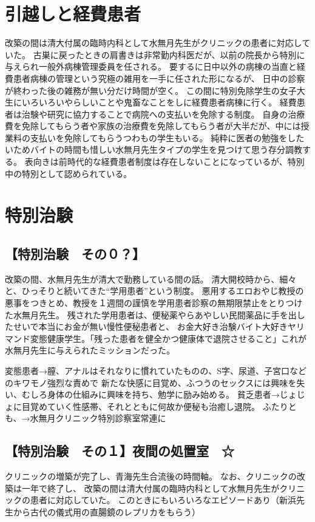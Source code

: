 \chapter{引越しと経費患者}
改築の間は清大付属の臨時内科として水無月先生がクリニックの患者に対応していた。
古巣に戻ったときの肩書きは非常勤内科医だが、以前の院長から特別に与えられ一般外病棟管理委員を任される。
要するに日中以外の病棟の当直と経費患者病棟の管理という究極の雑用を一手に任された形になるが、
日中の診察が終わった後の雑務が無い分だけ時間が空く。
この間に特別免除学生の女子大生にいろいろいやらしいことや鬼畜なことをしに経費患者病棟に行く。
経費患者は治験や研究に協力することで病院への支払いを免除する制度。
自身の治療費を免除してもらう者や家族の治療費を免除してもらう者が大半だが、中には授業料の支払いを免除してもらうつわもの学生もいる。
純粋に医者の勉強をしたいためバイトの時間も惜しい水無月先生タイプの学生を見つけて思う存分調教する。
表向きは前時代的な経費患者制度は存在しないことになっているが、特別中の特別として認められている。


\chapter{特別治験}
\section{【特別治験　その０？】}
改築の間、水無月先生が清大で勤務している間の話。
清大開校時から、細々と、ひっそりと続いてきた“学用患者”という制度。
悪用するエロおやじ教授の悪事をつきとめ、教授を１週間の謹慎を学用患者診察の無期限禁止をとりつけた水無月先生。
残された学用患者は、便秘薬やらあやしい民間薬品に手を出したせいで本当にお金が無い慢性便秘患者と、
お金大好き治験バイト大好きヤリマンド変態健康学生。「残った患者を健全かつ健康体で退院させること」これが水無月先生に与えられたミッションだった。

変態患者→膣、アナルはそれなりに慣れていたものの、S字、尿道、子宮口などのキワモノ強烈な責めで
新たな快感に目覚め、ふつうのセックスには興味を失い、むしろ身体の仕組みに興味を持ち、勉学に励み始める。
貧乏患者→じょじょに目覚めていく性感帯、それとともに何故か便秘も治癒し退院。
ふたりとも、→水無月クリニック特別診察室常連に


\section{【特別治験　その１】夜間の処置室　☆}


クリニックの増築が完了し、青海先生合流後の時間軸。
なお、クリニックの改築は一年で終了し、
改築の間は清大付属の臨時内科として水無月先生がクリニックの患者に対応していた。
このときにもいろいろなエピソードあり（新浜先生から古代の儀式用の直腸鏡のレプリカをもらう）


